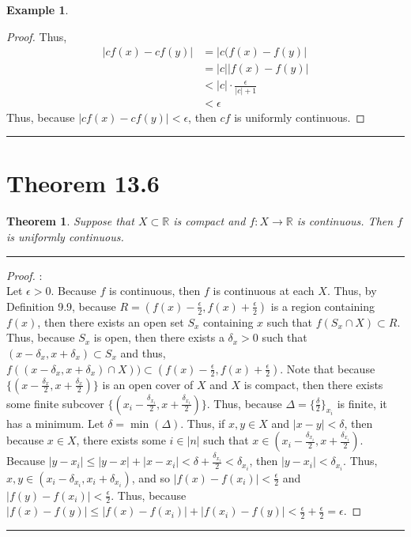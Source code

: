\documentclass[openany, amssymb, psamsfonts]{amsart}
\newcommand{\bbR}{\mathbb{R}}
\newtheorem{thm}{Theorem}[section]
\theoremstyle{definition}
\newtheorem{exmp}{Example}[section]
\numberwithin{equation}{section}
\begin{document}
\begin{exmp}
\begin{enumerate}[(a)]
\begin{proof}
Thus, 
\begin{align*}
|cf(x) - cf(y)| &= |c(f(x) - f(y)|\\
                &= |c||f(x) - f(y)|\\
                &< |c|\cdot \frac{\epsilon}{|c|+1}\\
                &< \epsilon
\end{align*}
Thus, because $|cf(x) - cf(y)| < \epsilon$, then $cf$ is uniformly continuous.
\end{proof} \vspace{4pt}     \hrule   \vspace{4pt}
	\end{enumerate}
\end{exmp}

\section*{Theorem 13.6}
\begin{thm}
\label{13.6}
	Suppose that $X \subset \bbR$ is compact and $f\colon X \to \bbR$ is continuous. Then $f$ is uniformly continuous.
\end{thm}
\vspace{4pt}     \hrule   \vspace{4pt} \begin{proof}:\\
Let $\epsilon>0$. Because $f$ is continuous, then $f$ is continuous at each $X$. Thus, by Definition 9.9, because $R = (f(x) - \frac{\epsilon}{2}, f(x) + \frac{\epsilon}{2})$ is a region containing $f(x)$, then there exists an open set $S_x$ containing $x$ such that $f(S_x \cap X) \subset R$. Thus, because $S_x$ is open, then there exists a $\delta_x>0$ such that $(x-\delta_x, x+\delta_x)\subset S_x$ and thus, $f((x-\delta_x, x+\delta_x) \cap X)) \subset (f(x) - \frac{\epsilon}{2}, f(x) + \frac{\epsilon}{2})$. Note that because $\{(x-\frac{\delta_x}{2}, x+\frac{\delta_x}{2})\}$ is an open cover of $X$ and $X$ is compact, then there exists some finite subcover $\{(x_i-\frac{\delta_{x_i}}{2}, x+\frac{\delta_{x_i}}{2})\}$. Thus, because $\Delta = \{\frac{\delta}{2}\}_{x_i}$ is finite, it has a minimum. Let $\delta = \min(\Delta)$. Thus, if $x,y\in X$ and $|x-y|< \delta$, then because $x\in X$, there exists some $i\in |n|$ such that $x\in (x_i-\frac{\delta_{x_i}}{2}, x+\frac{\delta_{x_i}}{2})$. Because $|y-x_i|\leq |y-x| + |x-x_i|<\delta + \frac{\delta_{x_i}}{2}<\delta_{x_i}$, then $|y-x_i|<\delta_{x_i}$. Thus, $x, y \in (x_i-\delta_{x_i}, x_i+ \delta_{x_i})$, and so $|f(x) - f(x_i)|<\frac{\epsilon}{2}$ and $|f(y) - f(x_i)|<\frac{\epsilon}{2}$. Thus, because $|f(x) - f(y)|\leq |f(x) - f(x_i)| + |f(x_i) - f(y)| < \frac{\epsilon}{2}+ \frac{\epsilon}{2} = \epsilon$.
\end{proof} \vspace{4pt}     \hrule   \vspace{4pt}
\end{document}
